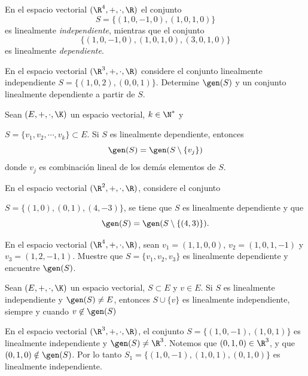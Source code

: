 \documentclass[compacto,10pt]{pubciencias-notas}
\begin{document}
\begin{ejem}\hspace{0pt}
En el espacio vectorial $(\R^4,+,\cdot,\R)$ el conjunto \[S = \{(1,0,-1,0), (1,0,1,0)\}\] es linealmente \emph{independiente}, mientras que el conjunto \[\{(1,0,-1,0), (1,0,1,0), (3,0,1,0)\}\] es linealmente \emph{dependiente}.
\end{ejem}

\begin{ejer}\hspace{0pt} 
En el espacio vectorial $(\R^3,+,\cdot,\R)$ considere el conjunto linealmente independiente $S=\{(1,0,2), (0,0,1)\}$. Determine $\gen(S)$ y un conjunto linealmente dependiente a partir de $S$.
\end{ejer}


\begin{prop}
    Sean $(E, +, \cdot, \K)$ un espacio vectorial, $k \in \N^{*}$ y
    
    \noindent $S = \{v_{1}, v_{2}, \cdots, v_{k} \} \subset E$. Si $S$ es linealmente dependiente, entonces
    \[
        \gen(S) = \gen(S \setminus \{ v_{j} \})
    \]
    donde $v_{j}$ es combinación lineal de los demás elementos de $S$.
\end{prop}

\begin{ejem}\hspace{0pt} En el espacio vectorial $(\R^{2},+,\cdot,\R)$, considere el conjunto 

\noindent $S = \{(1, 0), (0, 1), (4, -3)\}$, se tiene que $S$ es linealmente dependiente y que 
\[
    \gen(S) = \gen(S \setminus \{ (4,3) \}).
\]
\end{ejem}

\begin{ejer}\hspace{0pt} En el espacio vectorial $(\R^{4},+,\cdot,\R)$, sean $v_1=(1,1,0,0)$, $v_2=(1,0,1,-1)$ y $v_3=(1,2,-1,1)$. Muestre que $S=\{v_1, v_2, v_3\}$ es linealmente dependiente y encuentre $ \gen(S)$. 
\end{ejer}

\begin{prop}
    Sean $(E, +, \cdot, \K)$ un espacio vectorial, $S \subset E$ y $v \in E$. Si $S$ es linealmente independiente y $\gen(S) \not = E$, entonces $S \cup \{ v \}$ es linealmente independiente, siempre y cuando $v \not \in \gen(S)$
\end{prop}

\begin{ejem}\hspace{0pt} En el espacio vectorial $(\R^{3},+,\cdot,\R)$, el conjunto $S = \{(1,0,-1), (1,0,1)\} $ es linealmente independiente y $ \gen(S) \not = \R^{3}$. Notemos que $(0,1,0) \in \R^{3}$, y que $(0,1,0) \notin \gen(S)$. Por lo tanto $S_{1} = \{ (1,0,-1), (1,0,1), (0,1,0)\}$ es linealmente independiente.
\end{ejem}
\end{document}
